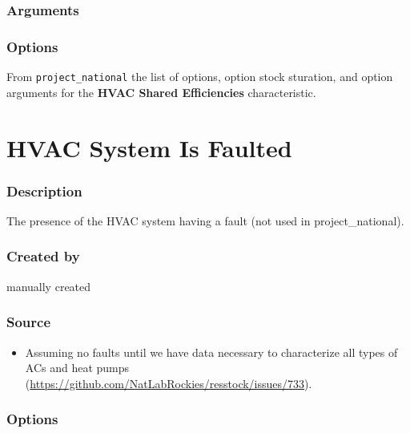 \subsubsection{Arguments}\label{arguments-49}



\subsubsection{Options}\label{options-78}

From \texttt{project\_national} the list of options, option stock
sturation, and option arguments for the \textbf{HVAC Shared
Efficiencies} characteristic.



\section{HVAC System Is Faulted}\label{hvac_system_is_faulted}

\subsubsection{Description}\label{description-79}

The presence of the HVAC system having a fault (not used in
project\_national).

\subsubsection{Created by}\label{created-by-79}

manually created

\subsubsection{Source}\label{source-78}

\begin{itemize}
 
\item
  Assuming no faults until we have data necessary to characterize all
  types of ACs and heat pumps
  (\url{https://github.com/NatLabRockies/resstock/issues/733}).
\end{itemize}

\subsubsection{Options}\label{options-79}

